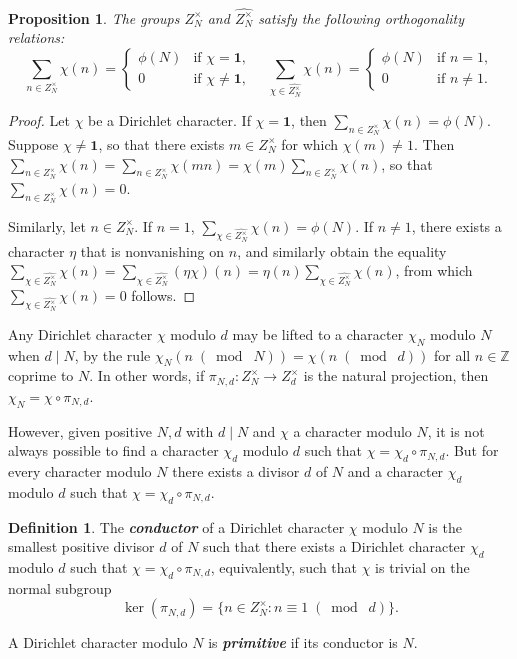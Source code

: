\documentclass[10pt,leqno,twoside]{article}
\theoremstyle{plain}
\newtheorem{proposition}[lem]{Proposition}
\theoremstyle{definition}
\newtheorem{definition/}[lem]{Definition}
\newenvironment{definition}
  {\renewcommand{\qedsymbol}{\textdagger}%
   \pushQED{\qed}\begin{definition/}}
  {\popQED\end{definition/}}
\numberwithin{equation}{section}
\numberwithin{lem}{section}
\newcommand{\textib}[1]{\textbf{\textit{#1\index{#1}}}} %
\newcommand{\smod}[1]{\;(\bmod\; #1)}
\begin{document}
\begin{proposition}
    The groups $Z_N^\times$ and $\widehat{Z_N^\times}$ satisfy the following orthogonality relations:
\begin{equation}\label{eqn: ortho rels}
    \sum_{n\in Z_N^\times}\chi(n) = \begin{cases}
    \phi(N) & \text{if $\chi = \mathbf 1$}, \\
    0 & \text{if $\chi\neq \mathbf 1$},
\end{cases}\quad \sum_{\chi\in \widehat{Z_N^\times}}\chi(n) = \begin{cases}
    \phi(N) & \text{if $n = 1$}, \\
    0 & \text{if $n\neq 1$}.
\end{cases}
\end{equation}
\end{proposition}

\begin{proof}
    Let $\chi$ be a Dirichlet character. If $\chi= \mathbf 1$, then $\sum_{n\in Z_N^\times}\chi(n) = \phi(N)$. Suppose $\chi\neq \mathbf 1$, so that there exists $m\in Z_N^\times$ for which $\chi(m)\neq 1$. Then $\sum_{n\in Z_N^\times}\chi(n) = \sum_{n\in Z_N^\times}\chi(mn) = \chi(m)\sum_{n\in Z_N^\times}\chi(n)$, so that $\sum_{n\in Z_N^\times}\chi(n) = 0$.

    Similarly, let $n\in Z_N^\times$. If $n = 1$, $\sum_{\chi\in \widehat{Z_N^\times}}\chi(n) = \phi(N)$. If $n\neq 1$, there exists a character $\eta$ that is nonvanishing on $n$, and similarly obtain the equality $\sum_{\chi\in \widehat{Z_N^\times}}\chi(n) =\sum_{\chi\in \widehat{Z_N^\times}}(\eta\chi)(n) =\eta(n)\sum_{\chi\in \widehat{Z_N^\times}}\chi(n)$, from which $\sum_{\chi\in \widehat{Z_N^\times}}\chi(n) = 0$ follows.
\end{proof}

Any Dirichlet character $\chi$ modulo $d$ may be lifted to a character $\chi_N$ modulo $N$ when $d\mid N$, by the rule $\chi_N(n\smod N) = \chi(n\smod d)$ for all $n\in\mathbb{Z}$ coprime to $N$. In other words, if $\pi_{N,d}\colon Z_N^\times\to Z_d^\times$ is the natural projection, then $\chi_N = \chi\circ \pi_{N,d}$.

However, given positive $N,d$ with $d\mid N$ and $\chi$ a character modulo $N$, it is not always possible to find a character $\chi_d$ modulo $d$ such that $\chi = \chi_d\circ \pi_{N,d}$. But for every character modulo $N$ there exists a divisor $d$ of $N$ and a character $\chi_d$ modulo $d$ such that $\chi = \chi_d\circ \pi_{N,d}$. 
\begin{definition}
    The \textib{conductor} of a Dirichlet character $\chi$ modulo $N$ is the smallest positive divisor $d$ of $N$ such that there exists a Dirichlet character $\chi_d$ modulo $d$ such that $\chi = \chi_d\circ \pi_{N,d}$, equivalently, such that $\chi$ is trivial on the normal subgroup 
    \[\ker(\pi_{N,d}) = \{n\in Z_N^\times : n\equiv 1\smod d\}.\]

    A Dirichlet character modulo $N$ is \textib{primitive} if its conductor is $N$.
\end{definition}
\end{document}
